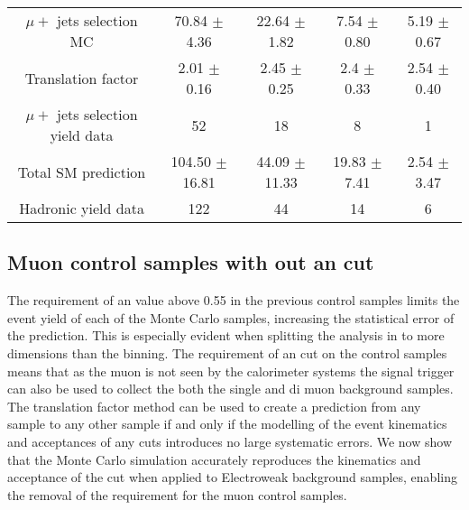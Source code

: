 \begin{table}[|h]
\begin{tabular}{ |c|c|c|c|c| }
$\mu +$ jets selection MC         & 70.84  $\pm$  4.36     & 22.64  $\pm$  1.82     & 7.54  $\pm$  0.80     & 5.19  $\pm$  0.67    \\ 
Translation factor                & 2.01  $\pm$  0.16      & 2.45  $\pm$  0.25      & 2.4  $\pm$  0.33     & 2.54  $\pm$  0.40    \\ 
$\mu +$ jets selection yield data & 52                     & 18                     & 8                     & 1                    \\ 
Total SM prediction               & 104.50  $\pm$  16.81   & 44.09  $\pm$  11.33    & 19.83  $\pm$  7.41    & 2.54  $\pm$  3.47    \\ 
Hadronic yield data               & 122                    & 44                     & 14                    & 6                    \\ 
\hline

\end{tabular}
\end{table}

\subsection{Muon control samples with out an \alt cut} %
\label{par:muon_control_samples_with_out_an_alt_cut_}
  
The requirement of an \alt value above 0.55 in the previous control samples 
limits the event yield of each of the Monte Carlo samples, increasing the 
statistical error of the prediction. This is especially evident when splitting 
the analysis in to more dimensions than the \HT binning. The requirement of an 
\alt cut on the control samples means that as the muon is not seen by the 
calorimeter systems the signal trigger can also be used to collect the both the 
single and di muon background samples.
The translation factor method can be used to create a prediction from any 
sample to any other sample if and only if the modelling of the event kinematics 
and acceptances of any cuts introduces no large systematic errors. We now show 
that the Monte Carlo simulation accurately reproduces the kinematics and 
acceptance of the \alt cut when applied to Electroweak background samples, 
enabling the removal of the \alt requirement for the muon control samples.


